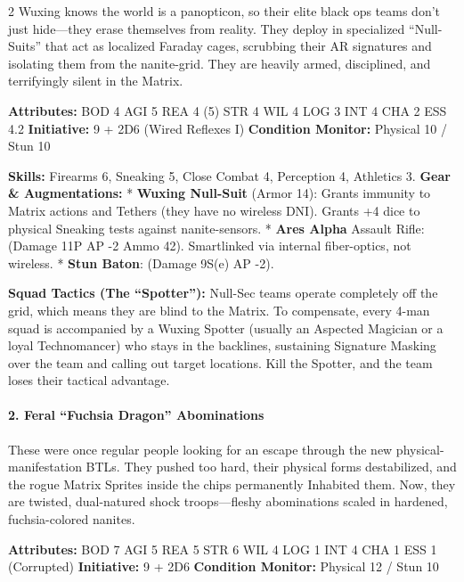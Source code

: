 \documentclass[
  oneside]{article}
\begin{document}
\begin{multicols}{2}
Wuxing knows the world is a panopticon, so their
elite black ops teams don't just hide---they erase
themselves from reality. They deploy in
specialized ``Null-Suits'' that act as localized
Faraday cages, scrubbing their AR signatures and
isolating them from the nanite-grid. They are
heavily armed, disciplined, and terrifyingly
silent in the Matrix.

\textbf{Attributes:} BOD 4 \textbar{} AGI 5
\textbar{} REA 4 (5) \textbar{} STR 4 \textbar{}
WIL 4 \textbar{} LOG 3 \textbar{} INT 4 \textbar{}
CHA 2 \textbar{} ESS 4.2 \textbf{Initiative:} 9 +
2D6 (Wired Reflexes I) \textbf{Condition Monitor:}
Physical 10 / Stun 10

\textbf{Skills:} Firearms 6, Sneaking 5, Close
Combat 4, Perception 4, Athletics 3. \textbf{Gear
\& Augmentations:} * \textbf{Wuxing Null-Suit}
(Armor 14): Grants immunity to Matrix actions and
Tethers (they have no wireless DNI). Grants +4
dice to physical Sneaking tests against
nanite-sensors. * \textbf{Ares Alpha} Assault
Rifle: (Damage 11P \textbar{} AP -2 \textbar{}
Ammo 42). Smartlinked via internal fiber-optics,
not wireless. * \textbf{Stun Baton}: (Damage 9S(e)
\textbar{} AP -2).

\textbf{Squad Tactics (The ``Spotter''):} Null-Sec
teams operate completely off the grid, which means
they are blind to the Matrix. To compensate, every
4-man squad is accompanied by a Wuxing Spotter
(usually an Aspected Magician or a loyal
Technomancer) who stays in the backlines,
sustaining Signature Masking over the team and
calling out target locations. Kill the Spotter,
and the team loses their tactical advantage.

\hypertarget{feral-fuchsia-dragon-abominations}{%
\paragraph{2. Feral ``Fuchsia Dragon''
Abominations}\label{feral-fuchsia-dragon-abominations}}

These were once regular people looking for an
escape through the new physical-manifestation
BTLs. They pushed too hard, their physical forms
destabilized, and the rogue Matrix Sprites inside
the chips permanently Inhabited them. Now, they
are twisted, dual-natured shock troops---fleshy
abominations scaled in hardened, fuchsia-colored
nanites.

\textbf{Attributes:} BOD 7 \textbar{} AGI 5
\textbar{} REA 5 \textbar{} STR 6 \textbar{} WIL 4
\textbar{} LOG 1 \textbar{} INT 4 \textbar{} CHA 1
\textbar{} ESS 1 (Corrupted) \textbf{Initiative:}
9 + 2D6 \textbf{Condition Monitor:} Physical 12 /
Stun 10


\end{multicols}
\end{document}
